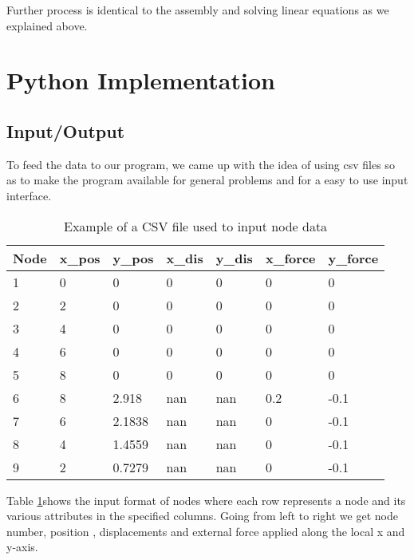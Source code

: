 Further process is identical to the assembly and solving linear equations as we explained above.
\section{\bf Python Implementation}

\subsection{Input/Output}
To feed the data to our program, we came up with the idea of using csv files so as to make the program available for general problems and for a easy to use input interface.\\


\begin{table}[h!]
	\centering
	\begin{tabular}{|l|l|l|l|l|l|l|}
		\hline
		Node & x\_pos & y\_pos & x\_dis & y\_dis & x\_force & y\_force \\
		\hline
		1    & 0      & 0      & 0      & 0      & 0        & 0        \\
		2    & 2      & 0      & 0      & 0      & 0        & 0        \\
		3    & 4      & 0      & 0      & 0      & 0        & 0        \\
		4    & 6      & 0      & 0      & 0      & 0        & 0        \\
		5    & 8      & 0      & 0      & 0      & 0        & 0        \\
		6    & 8      & 2.918  & nan    & nan    & 0.2      & -0.1     \\
		7    & 6      & 2.1838 & nan    & nan    & 0        & -0.1     \\
		8    & 4      & 1.4559 & nan    & nan    & 0        & -0.1     \\
		9    & 2      & 0.7279 & nan    & nan    & 0        & -0.1  	\\
		\hline  
	\end{tabular}
		\caption{Example of a CSV file used to input node data}
	\label{node_csv_table}
\end{table}

Table \ref{node_csv_table}shows the input format of nodes where each row represents a node and its various attributes in the specified columns. Going from left to right we get node number, position , displacements and external force applied along the local x and y-axis.\\

